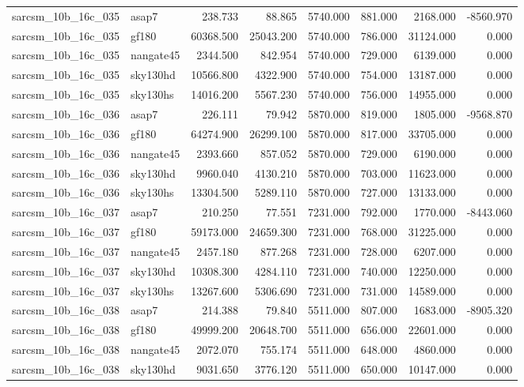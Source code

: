 \begin{tabular}{llrrrrrr}
sarcsm\_10b\_16c\_035 & asap7 & 238.733 & 88.865 & 5740.000 & 881.000 & 2168.000 & -8560.970 \\
sarcsm\_10b\_16c\_035 & gf180 & 60368.500 & 25043.200 & 5740.000 & 786.000 & 31124.000 & 0.000 \\
sarcsm\_10b\_16c\_035 & nangate45 & 2344.500 & 842.954 & 5740.000 & 729.000 & 6139.000 & 0.000 \\
sarcsm\_10b\_16c\_035 & sky130hd & 10566.800 & 4322.900 & 5740.000 & 754.000 & 13187.000 & 0.000 \\
sarcsm\_10b\_16c\_035 & sky130hs & 14016.200 & 5567.230 & 5740.000 & 756.000 & 14955.000 & 0.000 \\
sarcsm\_10b\_16c\_036 & asap7 & 226.111 & 79.942 & 5870.000 & 819.000 & 1805.000 & -9568.870 \\
sarcsm\_10b\_16c\_036 & gf180 & 64274.900 & 26299.100 & 5870.000 & 817.000 & 33705.000 & 0.000 \\
sarcsm\_10b\_16c\_036 & nangate45 & 2393.660 & 857.052 & 5870.000 & 729.000 & 6190.000 & 0.000 \\
sarcsm\_10b\_16c\_036 & sky130hd & 9960.040 & 4130.210 & 5870.000 & 703.000 & 11623.000 & 0.000 \\
sarcsm\_10b\_16c\_036 & sky130hs & 13304.500 & 5289.110 & 5870.000 & 727.000 & 13133.000 & 0.000 \\
sarcsm\_10b\_16c\_037 & asap7 & 210.250 & 77.551 & 7231.000 & 792.000 & 1770.000 & -8443.060 \\
sarcsm\_10b\_16c\_037 & gf180 & 59173.000 & 24659.300 & 7231.000 & 768.000 & 31225.000 & 0.000 \\
sarcsm\_10b\_16c\_037 & nangate45 & 2457.180 & 877.268 & 7231.000 & 728.000 & 6207.000 & 0.000 \\
sarcsm\_10b\_16c\_037 & sky130hd & 10308.300 & 4284.110 & 7231.000 & 740.000 & 12250.000 & 0.000 \\
sarcsm\_10b\_16c\_037 & sky130hs & 13267.600 & 5306.690 & 7231.000 & 731.000 & 14589.000 & 0.000 \\
sarcsm\_10b\_16c\_038 & asap7 & 214.388 & 79.840 & 5511.000 & 807.000 & 1683.000 & -8905.320 \\
sarcsm\_10b\_16c\_038 & gf180 & 49999.200 & 20648.700 & 5511.000 & 656.000 & 22601.000 & 0.000 \\
sarcsm\_10b\_16c\_038 & nangate45 & 2072.070 & 755.174 & 5511.000 & 648.000 & 4860.000 & 0.000 \\
sarcsm\_10b\_16c\_038 & sky130hd & 9031.650 & 3776.120 & 5511.000 & 650.000 & 10147.000 & 0.000 \\

\end{tabular}
